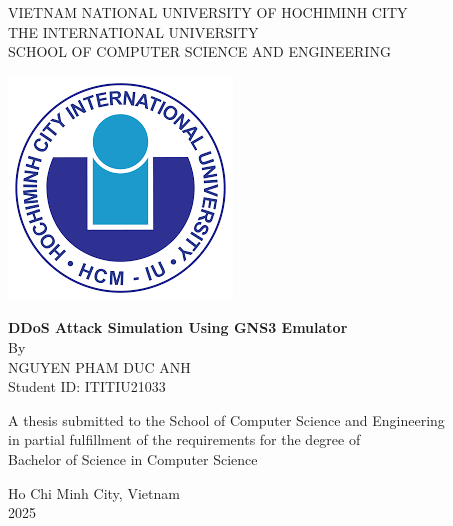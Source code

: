 \begin{titlepage}
    \begin{center}
        \vspace{1.0cm}
        
        \large
        VIETNAM NATIONAL UNIVERSITY OF HOCHIMINH CITY\\
        \large
        THE INTERNATIONAL UNIVERSITY\\
        \large
        SCHOOL OF COMPUTER SCIENCE AND ENGINEERING
        
        
        \vspace{3cm}
        \includegraphics[scale=0.8]{images/iu.png}
        \vspace{3cm}
        
        \Huge
        \textbf{DDoS Attack Simulation Using GNS3 Emulator}\\
        
        \Large
        By\\
        {NGUYEN PHAM DUC ANH}
        \\ 
        {Student ID: ITITIU21033}    
        \vspace{2.0cm}
        
            
        
            
        \large
        A thesis submitted to the School of Computer Science and Engineering \\
        in partial fulfillment of the requirements for the degree of \\
        Bachelor of Science in Computer Science
        
        \vfill
        Ho Chi Minh City, Vietnam\\
        2025
        
    \end{center}
\end{titlepage}